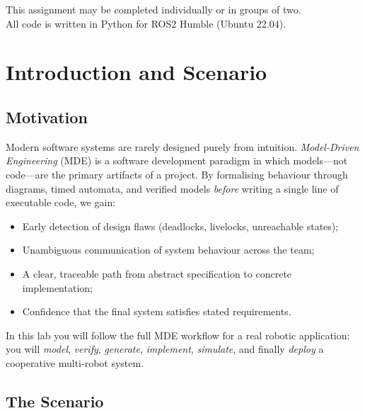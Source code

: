 \documentclass[11pt, a4paper]{article}
\begin{document}
\begin{titlepage}
\vfill
{\small\color{gray} This assignment may be completed individually or in groups of two.\\
All code is written in Python for ROS2 Humble (Ubuntu 22.04).}

\end{titlepage}

\tableofcontents
\newpage

\section{Introduction and Scenario}

\subsection{Motivation}

Modern software systems are rarely designed purely from intuition.
\textit{Model-Driven Engineering} (MDE) is a software development paradigm in which
models—not code—are the primary artifacts of a project.
By formalising behaviour through diagrams, timed automata, and verified models
\emph{before} writing a single line of executable code, we gain:

\begin{itemize}
  \item Early detection of design flaws (deadlocks, livelocks, unreachable states);
  \item Unambiguous communication of system behaviour across the team;
  \item A clear, traceable path from abstract specification to concrete implementation;
  \item Confidence that the final system satisfies stated requirements.
\end{itemize}

In this lab you will follow the full MDE workflow for a real robotic application:
you will \emph{model}, \emph{verify}, \emph{generate}, \emph{implement}, \emph{simulate},
and finally \emph{deploy} a cooperative multi-robot system.

\subsection{The Scenario}
\end{document}
